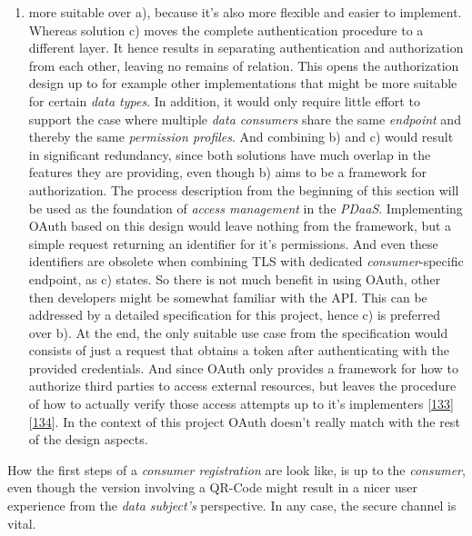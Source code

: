 \documentclass[12pt,english,a4paper,titlepage,cleardoublepage=empty,dottedtoc]{report}
\providecommand{\tightlist}{%
  \setlength{\itemsep}{0pt}\setlength{\parskip}{0pt}}
\begin{document}
\begin{enumerate}
\def\labelenumi{\alph{enumi})}
\setcounter{enumi}{1}
\tightlist
\item
  more suitable over a), because it's also more flexible and easier to
  implement. Whereas solution c) moves the complete authentication
  procedure to a different layer. It hence results in separating
  authentication and authorization from each other, leaving no remains
  of relation. This opens the authorization design up to for example
  other implementations that might be more suitable for certain
  \emph{data types}. In addition, it would only require little effort to
  support the case where multiple \emph{data consumers} share the same
  \emph{endpoint} and thereby the same \emph{permission profiles}. And
  combining b) and c) would result in significant redundancy, since both
  solutions have much overlap in the features they are providing, even
  though b) aims to be a framework for authorization. The process
  description from the beginning of this section will be used as the
  foundation of \emph{access management} in the \emph{PDaaS}.
  Implementing OAuth based on this design would leave nothing from the
  framework, but a simple request returning an identifier for it's
  permissions. And even these identifiers are obsolete when combining
  TLS with dedicated \emph{consumer}-specific endpoint, as c) states. So
  there is not much benefit in using OAuth, other then developers might
  be somewhat familiar with the API. This can be addressed by a detailed
  specification for this project, hence c) is preferred over b). At the
  end, the only suitable use case from the specification would consists
  of just a request that obtains a token after authenticating with the
  provided credentials. And since OAuth only provides a framework for
  how to authorize third parties to access external resources, but
  leaves the procedure of how to actually verify those access attempts
  up to it's implementers
  {[}\protect\hyperlink{ref-web_spec_oauth-1a_access-verification}{133}{]}
  {[}\protect\hyperlink{ref-web_spec_oauth-2_access-verification}{134}{]}.
  In the context of this project OAuth doesn't really match with the
  rest of the design aspects.
\end{enumerate}

How the first steps of a \emph{consumer registration} are look like, is
up to the \emph{consumer}, even though the version involving a QR-Code
might result in a nicer user experience from the \emph{data subject's}
perspective. In any case, the secure channel is vital.
\end{document}
